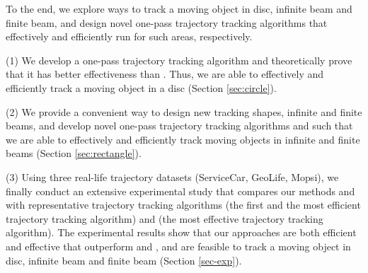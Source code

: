 To the end, we explore ways to track a moving object in disc, infinite beam and finite beam, and design novel one-pass trajectory tracking algorithms that effectively and efficiently run for such areas, respectively. 

\ni (1) We develop a one-pass trajectory tracking algorithm \citt and theoretically prove that it has better effectiveness than \ldrh. Thus, we are able to effectively and efficiently track a moving object in a disc (Section \ref{sec:circle}).


\ni (2) We provide a convenient way to design new tracking shapes, \ie  infinite and finite beams, and develop novel one-pass trajectory tracking algorithms \sitt and \bitt such that we are able to effectively and efficiently track moving objects in infinite and finite beams (Section \ref{sec:rectangle}). 

\ni (3) Using three real-life trajectory datasets (ServiceCar, GeoLife, Mopsi), we finally conduct an extensive experimental study that compares our methods \citt and \bitt with representative trajectory tracking algorithms \ldrh (the first and the most efficient trajectory tracking algorithm) and \grts (the most effective trajectory tracking algorithm). The experimental results show that our approaches are both efficient and effective that outperform \ldrh and \grts, and are feasible to track a moving object in disc, infinite beam and finite beam (Section \ref{sec-exp}).




